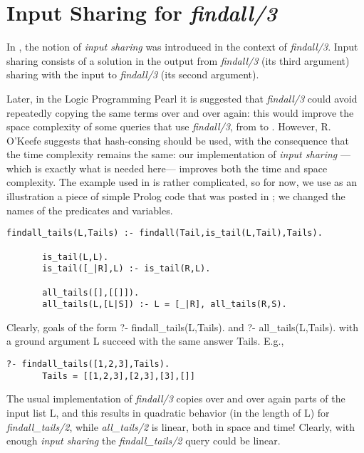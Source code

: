 \documentclass{tlp}
\begin{document}
\section{Input Sharing for {\em findall/3}}\label{findall}

In \cite{findallwithoutfindall}, the notion of {\em input sharing} was
introduced in the context of {\em findall/3}.  Input sharing consists
of a solution in the output from {\em findall/3} (its third argument)
sharing with the input to {\em findall/3} (its second argument).

Later, in the Logic Programming Pearl \cite{OKeefePearl} it is
suggested that {\em findall/3} could avoid repeatedly copying the same
terms over and over again: this would improve the space complexity of
some queries that use {\em findall/3}, from  to
. However, R. O'Keefe suggests that hash-consing should be used,
with the consequence that the time complexity remains the same: our
implementation of {\em input sharing} ---which is exactly what is
needed here--- improves both the time and space complexity. The example
used in \cite{OKeefePearl} is rather complicated, so for now, we use
as an illustration a piece of simple Prolog code that was posted in
\cite{findall1archive}; we changed the names of the predicates and
variables.

\begin{Verbatim}[fontsize=\small, frame=single,samepage=true]
       findall_tails(L,Tails) :- findall(Tail,is_tail(L,Tail),Tails).
       
       is_tail(L,L).
       is_tail([_|R],L) :- is_tail(R,L).
       
       all_tails([],[[]]).
       all_tails(L,[L|S]) :- L = [_|R], all_tails(R,S).
\end{Verbatim}


Clearly, goals of the form 
?- findall\_tails(L,Tails).
and
?- all\_tails(L,Tails).
with a ground argument L succeed with the same answer Tails. E.g.,

\begin{Verbatim}[fontsize=\small, frame=single,samepage=true]
       ?- findall_tails([1,2,3],Tails).
       Tails = [[1,2,3],[2,3],[3],[]]
\end{Verbatim}



The usual implementation of {\em findall/3} copies over and over again parts of
the input list L, and this results in quadratic behavior (in the
length of L) for {\em findall\_tails/2}, while {\em all\_tails/2} is linear, both
in space and time! Clearly, with enough {\em input sharing} the
{\em findall\_tails/2} query could be linear.
\end{document}
